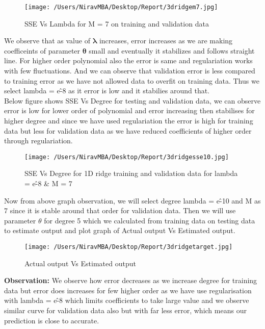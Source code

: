 \documentclass[12pt]{report}
\begin{document}
\begin{figure}[H]
	\centering
	\texttt{[image: /Users/NiravMBA/Desktop/Report/3dridgem7.jpg]}
	\caption{SSE Vs Lambda for M = 7 on training and validation data} 
\end{figure}

We observe that as value of $ \mathbf{\lambda} $ increases, error increases as we are making coefficeints of parameter $ \mathbf{\theta} $ small and eventually it stabilizes and follows straight line. For higher order polynomial also the error is same and regulariation works with few fluctuations. And we can observe that validation error is less compared to training error as we have not allowed data to overfit on training data. Thus we select lambda = e\^-8 as it error is low and it stabilies around that. \\

Below figure shows SSE Vs Degree for testing and validation data, we can observe error is low for lower order of polynomial and error increasing then stabilises for higher degree and since we have used regulariation the error is high for training data but less for validation data as we have reduced coefficients of higher order through regulariation. \\

\begin{figure}[H]
	\centering
	\texttt{[image: /Users/NiravMBA/Desktop/Report/3dridgesse10.jpg]}
	\caption{SSE Vs Degree for 1D ridge training and validation data for lambda = e\^-8  \& M = 7} 
\end{figure}


Now from above graph observation, we will select degree lambda = e\^-10  and M as 7 since it is stable around that order for validation data. Then we will use parameter $ {\theta } $ for degree 5 which we calculated from training data on testing data to estimate output and plot graph of Actual output Vs Estimated output.\\


\begin{figure}[H]
	
	\texttt{[image: /Users/NiravMBA/Desktop/Report/3dridgetarget.jpg]}
	\caption{Actual output Vs Estimated output} 
\end{figure}

{\bfseries Observation: } 
We observe how error decreases as we increase degree for training data but error does increases for few higher order as we have use regularisation with lambda = e\^-8 which limits coefficients to take large value and we observe similar curve for validation data also but with far less error, which means our prediction is close to accurate.
\end{document}
